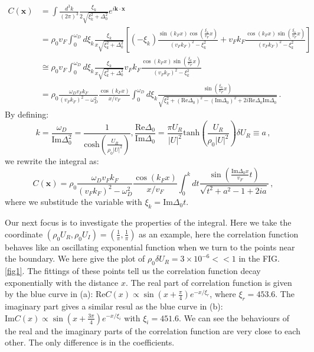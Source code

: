\documentclass[aps,onecolumn,nofootinbib,superscriptaddress,notitlepage,longbibliography]{revtex4-1}
\begin{document}
\begin{align}
C(\bm{x}) & =\int\frac{d^{3}k}{(2\pi)^{3}}\frac{\xi_{k}}{2\sqrt{\xi_{k}^{2}+\Delta_{0}^{2}}}e^{i\bm{k}\cdot\bm{x}}\nonumber \\
 & =\rho_{0}v_{F}\int_{0}^{\omega_{D}}d\xi_{k}\frac{\xi_{k}}{x\sqrt{\xi_{k}^{2}+\Delta_{0}^{2}}}\left[(-\xi_{k})\frac{\sin(k_{F}x)\cos\left(\frac{\xi_{k}}{v_{F}}x\right)}{(v_{F}k_{F})^{2}-\xi_{k}^{2}}+v_{F}k_{F}\frac{\cos(k_{F}x)\sin\left(\frac{\xi_{k}}{v_{F}}x\right)}{(v_{F}k_{F})^{2}-\xi_{k}^{2}}\right]\nonumber \\
 & \cong\rho_{0}v_{F}\int_{0}^{\omega_{D}}d\xi_{k}\frac{\xi_{k}}{x\sqrt{\xi_{k}^{2}+\Delta_{0}^{2}}}v_{F}k_{F}\frac{\cos(k_{F}x)\sin\left(\frac{\xi_{k}}{v_{F}}x\right)}{(v_{F}k_{F})^{2}-\xi_{k}^{2}}\nonumber \\
 & =\rho_{0}\frac{\omega_{D}v_{F}k_{F}}{(v_{F}k_{F})^{2}-\omega_{D}^{2}}\frac{\cos(k_{F}x)}{x/v_{F}}\int_{0}^{\omega_{D}}d\xi_{k}\frac{\sin\left(\frac{\xi_{k}}{v_{F}}x\right)}{\sqrt{\xi_{k}^{2}+(\text{Re}\Delta_{0})^{2}-(\text{Im}\Delta_{0})^{2}+2i\text{Re}\Delta_{0}\text{Im}\Delta_{0}}}\,.\label{correlation}
\end{align}
By defining: 
\begin{equation}
k=\frac{\omega_{D}}{\text{Im}\Delta_{0}^{2}}=\frac{1}{\text{cosh}(\frac{U_{R}}{\rho_{0}|U|^{2}})},\frac{\text{Re}\Delta_{0}}{\text{Im}\Delta_{0}}=\frac{\pi U_{R}}{|U|^{2}}\text{tanh}(\frac{U_{R}}{\rho_{0}|U|^{2}})\delta U_{R}\equiv a\,,
\end{equation}
we rewrite the integral as: 
\begin{equation}
C(\bm{x})=\rho_{0}\frac{\omega_{D}v_{F}k_{F}}{(v_{F}k_{F})^{2}-\omega_{D}^{2}}\frac{\cos(k_{F}x)}{x/v_{F}}\int_{0}^{k}dt\frac{\sin(\frac{\text{Im}\Delta_{0}x}{v_{F}}t)}{\sqrt{t^{2}+a^{2}-1+2ia}}\,,\label{integral_expresion}
\end{equation}
where we substitude the variable with $\xi_{k}=\text{Im}\Delta_{0}t$.

Our next focus is to investigate the properties of the integral. Here
we take the coordinate $(\rho_{0}U_{R},\rho_{0}U_{I})=(\frac{1}{\pi},\frac{1}{\pi})$
as an example, here the correlation function behaves like an oscillating
exponential function when we turn to the points near the boundary.
We here give the plot of $\rho_{0}\delta U_{R}=3\times10^{-6}<<1$
in the FIG. \ref{fig1}. The fittings of these points tell us the
correlation function decay exponentially with the distance $x$. The
real part of correlation function is given by the blue curve in (a):
$\text{Re}C(x)\propto\sin(x+\frac{\pi}{4})e^{-x/\xi_{r}}$, where
$\xi_{r}=453.6$. The imaginary part gives a similar resul as the
blue curve in (b): $\text{Im}C(x)\propto\sin(x+\frac{3\pi}{4})e^{-x/\xi_{i}}$
with $\xi_{i}=451.6$. We can see the behaviours of the real and the
imaginary parts of the correlation function are very close to each
other. The only difference is in the coefficients.
\end{document}
